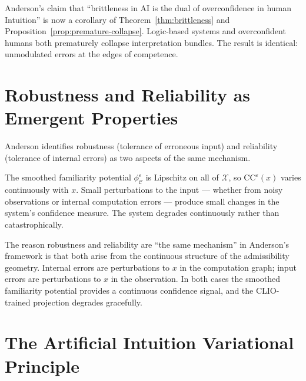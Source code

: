 \documentclass[12pt, a4paper, oneside]{book}
\newcommand{\X}{\mathcal{X}}
\newcommand{\C}{\mathcal{C}}
\newcommand{\CC}{\mathrm{CC}}
\newcommand{\phiCe}{\phi_{\C}^{\varepsilon}}
\begin{document}
\begin{remark}
Anderson's claim that ``brittleness in AI is the dual of overconfidence
in human Intuition'' is now a corollary of
Theorem~\ref{thm:brittleness} and
Proposition~\ref{prop:premature-collapse}. Logic-based systems and
overconfident humans both prematurely collapse interpretation bundles.
The result is identical: unmodulated errors at the edges of competence.
\end{remark}

\section{Robustness and Reliability as Emergent Properties}

Anderson identifies robustness (tolerance of erroneous input) and
reliability (tolerance of internal errors) as two aspects of the same
mechanism.

\begin{proposition}
\label{prop:robustness}
The smoothed familiarity potential $\phiCe$ is Lipschitz on all of $\X$,
so $\CC^\varepsilon(x)$ varies continuously with $x$. Small perturbations
to the input --- whether from noisy observations or internal computation
errors --- produce small changes in the system's confidence measure.
The system degrades continuously rather than catastrophically.
\end{proposition}

\begin{remark}
The reason robustness and reliability are ``the same mechanism'' in
Anderson's framework is that both arise from the continuous structure of
the admissibility geometry. Internal errors are perturbations to $x$ in
the computation graph; input errors are perturbations to $x$ in the
observation. In both cases the smoothed familiarity potential provides a
continuous confidence signal, and the CLIO-trained projection degrades
gracefully.
\end{remark}

\section{The Artificial Intuition Variational Principle}
\end{document}
